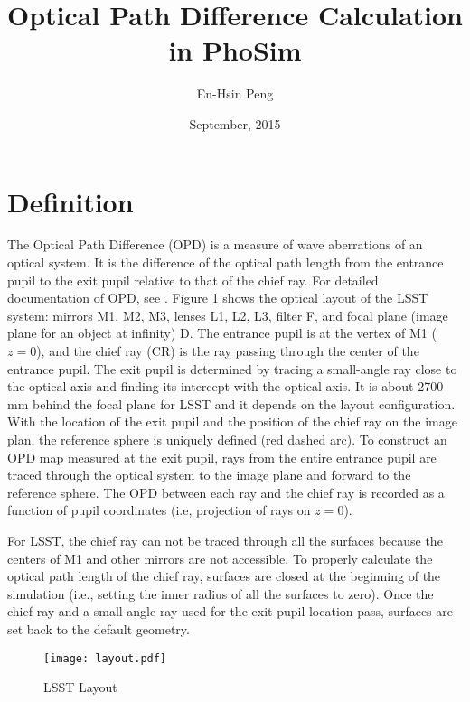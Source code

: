 \documentclass[12pt,twoside]{article}
\begin{document}
\title {{Optical Path Difference Calculation in PhoSim}}
\author{{En-Hsin Peng}}
\date{September, 2015}






\maketitle



\section{Definition}
The Optical Path Difference (OPD) is a measure of wave aberrations of an optical system. It is the difference of the optical path length from the entrance pupil to the exit pupil relative to that of the chief ray. For detailed documentation of OPD, see \cite{opddef}. Figure \ref{fig:layout} shows the optical layout of the LSST system: mirrors M1, M2, M3, lenses L1, L2, L3, filter F, and focal plane (image plane for an object at infinity) D. The entrance pupil is at the vertex of M1 ($z=0$), and the chief ray (CR) is the ray passing through the center of the entrance pupil. The exit pupil is determined by tracing a small-angle ray close to the optical axis and finding its intercept with the optical axis. It is about 2700 mm behind the focal plane for LSST and it depends on the layout configuration. With the location of the exit pupil and the position of the chief ray on the image plan, the reference sphere is uniquely defined (red dashed arc). To construct an OPD map measured at the exit pupil, rays from the entire entrance pupil are traced through the optical system to the image plane and forward to the reference sphere. The OPD between each ray and the chief ray is recorded as a function of pupil coordinates (i.e, projection of rays on $z=0$).

For LSST, the chief ray can not be traced through all the surfaces because the centers of M1 and other mirrors are not accessible. To properly calculate the optical path length of the chief ray, surfaces are closed at the beginning  of the simulation (i.e., setting the inner radius of all the surfaces to zero). Once the chief ray and a small-angle ray used for the exit pupil location pass, surfaces are set back to the default geometry.



\begin{figure}[h!tb]
\begin{center}
\texttt{[image: layout.pdf]}
\end{center}
\caption{LSST Layout}
\label{fig:layout}
\end{figure}
 
\end{document}
